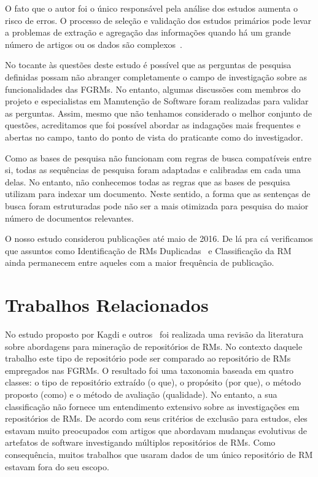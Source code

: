 O fato que o autor foi o único responsável pela análise dos estudos aumenta o
risco de erros. O processo de seleção e validação dos estudos primários pode
levar a problemas de extração e agregação das informações quando há um grande
número de artigos ou os dados são complexos~\cite{keele2007guidelines}.

No tocante às questões deste estudo é possível que as perguntas de pesquisa
definidas possam não abranger completamente o campo de investigação sobre as
funcionalidades das FGRMs. No entanto, algumas discussões com membros do
projeto e especialistas em Manutenção de Software foram realizadas para validar
as perguntas. Assim, mesmo que não tenhamos considerado o melhor conjunto de
questões, acreditamos que foi possível abordar as indagações mais frequentes e
abertas no campo, tanto do ponto de vista do praticante como do investigador.

Como as bases de pesquisa não funcionam com regras de busca compatíveis entre
si, todas as sequências de pesquisa foram adaptadas e calibradas em cada uma
delas. No entanto, não conhecemos todas as regras que as bases de pesquisa
utilizam para indexar um documento. Neste sentido, a forma que as sentenças de
busca foram estruturadas pode não ser a mais otimizada para pesquisa do maior
número de documentos relevantes.

O nosso estudo considerou publicações até maio de 2016. De lá pra cá
verificamos que assuntos como Identificação de RMs
Duplicadas~\cite{aggarwal2017detecting, chaparro2017improving,
    sadat2017rediscovery} e Classificação da RM~\cite{karim2017understanding,
    zibran2016effectiveness, ohira2016case} ainda permanecem entre aqueles com
a maior frequência de publicação.

\section{Trabalhos Relacionados}\label{sec:map_trabalhos_relacionados}

No estudo proposto por Kagdi e outros~\cite{kagdi2012assigning} foi realizada
uma revisão da literatura sobre abordagens para mi\-ne\-ra\-ção de repositórios
de RMs. No contexto daquele trabalho este tipo de repositório pode ser
comparado ao repositório de RMs empregados nas FGRMs. O resultado foi uma
taxonomia baseada em quatro classes: o tipo de repositório extraído (o que), o
propósito (por que), o método proposto (como) e o método de avaliação
(qualidade). No entanto, a sua classificação não fornece um entendimento
extensivo sobre as investigações em repositórios de RMs\@. De acordo com seus
critérios de exclusão para estudos, eles estavam muito preocupados com artigos
que abordavam mudanças evolutivas de artefatos de software investigando
múltiplos repositórios de RMs. Como consequência, muitos trabalhos que usaram
dados de um único repositório de RM estavam fora do seu escopo.

